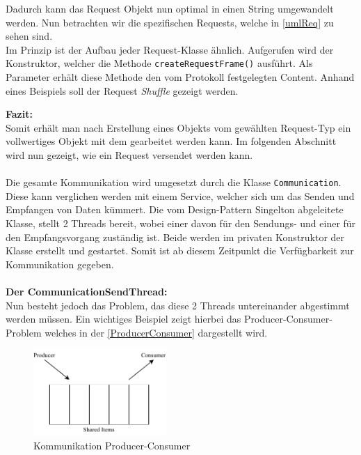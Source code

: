 Dadurch kann das Request Objekt nun optimal in einen String umgewandelt werden.
Nun betrachten wir die spezifischen Requests, welche in \autoref{umlReq} zu sehen sind.\\
Im Prinzip ist der Aufbau jeder Request-Klasse ähnlich.
Aufgerufen wird der Konstruktor, welcher die Methode \lstinline[style=java]{createRequestFrame()} ausführt.
Als Parameter erhält diese Methode den vom Protokoll festgelegten Content.
Anhand eines Beispiels soll der Request \textit{Shuffle} gezeigt werden.

\textbf{Fazit:}\\
Somit erhält man nach Erstellung eines Objekts vom gewählten Request-Typ ein vollwertiges Objekt mit dem gearbeitet werden kann.
Im folgenden Abschnitt wird nun gezeigt, wie ein Request versendet werden kann.\\\\
Die gesamte Kommunikation wird umgesetzt durch die Klasse \lstinline[style=java]{Communication}.
Diese kann verglichen werden mit einem Service, welcher sich um das Senden und Empfangen von Daten kümmert.
Die vom Design-Pattern Singelton abgeleitete Klasse, stellt 2 Threads bereit, wobei einer davon für den Sendungs- und einer für den Empfangsvorgang zuständig ist.
Beide werden im privaten Konstruktor der Klasse erstellt und gestartet.
Somit ist ab diesem Zeitpunkt die Verfügbarkeit zur Kommunikation gegeben.\\\\
\textbf{Der CommunicationSendThread:}\\
Nun besteht jedoch das Problem, das diese 2 Threads untereinander abgestimmt werden müssen.
Ein wichtiges Beispiel zeigt hierbei das Producer-Consumer-Problem welches in der \autoref{ProducerConsumer} dargestellt wird.
\begin{figure}[H]
\centering
\includegraphics[width=0.45\textwidth]{fig/ainf/ProducerConsumer.pdf}
\caption{Kommunikation Producer-Consumer}
\label{ProducerConsumer}
\end{figure}
